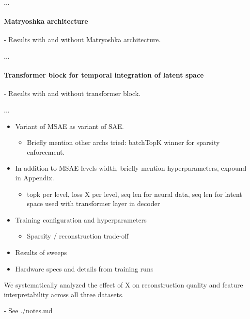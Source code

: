 ...

\paragraph{Matryoshka architecture}

- Results with and without Matryoshka architecture.

...

\paragraph{Transformer block for temporal integration of latent space}

- Results with and without transformer block.

...

\begin{itemize}
    
    \item Variant of MSAE as variant of SAE.
    \begin{itemize}
        \item Briefly mention other archs tried: batchTopK winner for sparsity enforcement.
    \end{itemize}
    
    \item In addition to MSAE levels width, briefly mention hyperparameters, expound in Appendix.
    \begin{itemize}
        \item topk per level, loss X per level, seq len for neural data, seq len for latent space used with transformer layer in decoder
    \end{itemize}

\end{itemize}

\begin{itemize}
    \item Training configuration and hyperparameters
    \begin{itemize}
        \item Sparsity / reconstruction trade-off
    \end{itemize}
    \item Results of sweeps
    \item Hardware specs and details from training runs
\end{itemize}

We systematically analyzed the effect of X on reconstruction quality and feature interpretability across all three datasets.

- See ./notes.md